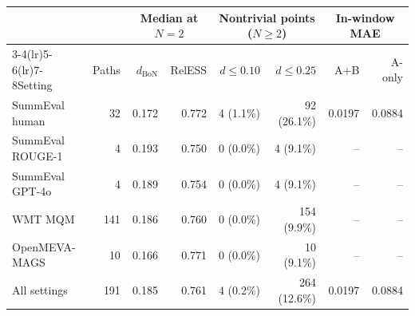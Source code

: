 \begin{tabular}{lrrrrrrr}
\toprule
 &  & \multicolumn{2}{c}{Median at $N=2$} & \multicolumn{2}{c}{Nontrivial points ($N\ge2$)} & \multicolumn{2}{c}{In-window MAE} \\
\cmidrule(lr){3-4}\cmidrule(lr){5-6}\cmidrule(lr){7-8}Setting & Paths & $d_{\mathrm{BoN}}$ & RelESS & $d\le0.10$ & $d\le0.25$ & A+B & A-only \\
\midrule
SummEval human & 32 & 0.172 & 0.772 & 4 (1.1\%) & 92 (26.1\%) & 0.0197 & 0.0884 \\
SummEval ROUGE-1 & 4 & 0.193 & 0.750 & 0 (0.0\%) & 4 (9.1\%) & -- & -- \\
SummEval GPT-4o & 4 & 0.189 & 0.754 & 0 (0.0\%) & 4 (9.1\%) & -- & -- \\
WMT MQM & 141 & 0.186 & 0.760 & 0 (0.0\%) & 154 (9.9\%) & -- & -- \\
OpenMEVA-MAGS & 10 & 0.166 & 0.771 & 0 (0.0\%) & 10 (9.1\%) & -- & -- \\
\midrule
All settings & 191 & 0.185 & 0.761 & 4 (0.2\%) & 264 (12.6\%) & 0.0197 & 0.0884 \\
\bottomrule
\end{tabular}
